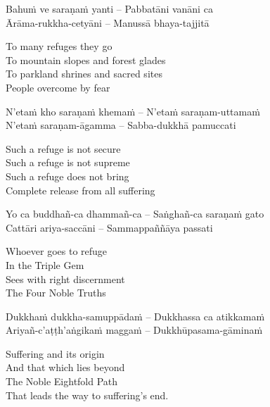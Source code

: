 \begin{twochants}
  Bahuṁ ve saraṇaṁ yanti – Pabbatāni vanāni ca\\
  Ārāma-rukkha-cetyāni – Manussā bhaya-tajjitā\\
\end{twochants}

\begin{english}
  To many refuges they go\\
  To mountain slopes and forest glades\\
  To parkland shrines and sacred sites\\
  People overcome by fear
\end{english}

\begin{twochants}
  N'etaṁ kho saraṇaṁ khemaṁ – N'etaṁ saraṇam-uttamaṁ\\
  N'etaṁ saraṇam-āgamma – Sabba-dukkhā pamuccati\\
\end{twochants}

\begin{english}
  Such a refuge is not secure\\
  Such a refuge is not supreme\\
  Such a refuge does not bring\\
  Complete release from all suffering
\end{english}

\begin{twochants}
  Yo ca buddhañ-ca dhammañ-ca – Saṅghañ-ca saraṇaṁ gato\\
  Cattāri ariya-saccāni – Sammappaññāya passati\\
\end{twochants}

\begin{english}
  Whoever goes to refuge\\
  In the Triple Gem\\
  Sees with right discernment\\
  The Four Noble Truths
\end{english}

\begin{twochants}
  Dukkhaṁ dukkha-samuppādaṁ – Dukkhassa ca atikkamaṁ\\
  Ariyañ-c'aṭṭh'aṅgikaṁ maggaṁ – Dukkhūpasama-gāminaṁ\\
\end{twochants}

\begin{english}
  Suffering and its origin\\
  And that which lies beyond\\
  The Noble Eightfold Path\\
  That leads the way to suffering's end.
\end{english}

